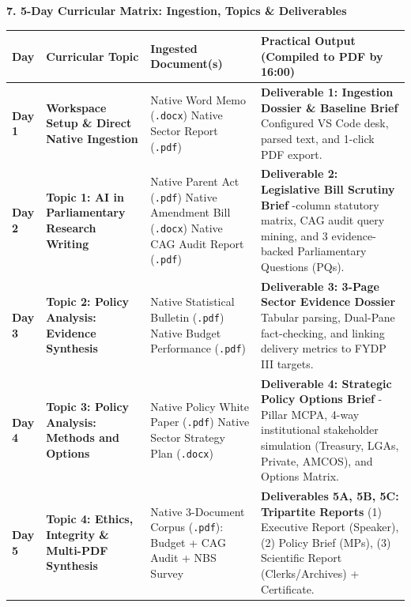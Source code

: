 \documentclass[10pt, a4paper]{article}
\begin{document}
\vspace{-0.15cm}
\noindent\textbf{\textcolor{tanzaniablue}{\large 7. 5-Day Curricular Matrix: Ingestion, Topics \& Deliverables}}
\vspace{0.1cm}
\begin{table}[htbp]
\centering
\footnotesize
\begin{tabular}{@{}>{\bfseries}p{1.1cm}p{3.5cm}p{4.8cm}p{6.8cm}@{}}
\toprule
Day & Curricular Topic & Ingested Document(s) & Practical Output (Compiled to PDF by 16:00) \\
\midrule
\textbf{Day 1} & \textbf{Workspace Setup \& Direct Native Ingestion} & Native Word Memo (\texttt{.docx}) \newline Native Sector Report (\texttt{.pdf}) & \textbf{Deliverable 1: Ingestion Dossier \& Baseline Brief} \newline Configured VS Code desk, parsed text, and 1-click PDF export. \\
\addlinespace[3pt]
\textbf{Day 2} & \textbf{Topic 1: AI in Parliamentary Research Writing} & Native Parent Act (\texttt{.pdf}) \newline Native Amendment Bill (\texttt{.docx}) \newline Native CAG Audit Report (\texttt{.pdf}) & \textbf{Deliverable 2: Legislative Bill Scrutiny Brief} \newline 4-column statutory matrix, CAG audit query mining, and 3 evidence-backed Parliamentary Questions (PQs). \\
\addlinespace[3pt]
\textbf{Day 3} & \textbf{Topic 2: Policy Analysis: Evidence Synthesis} & Native Statistical Bulletin (\texttt{.pdf}) \newline Native Budget Performance (\texttt{.pdf}) & \textbf{Deliverable 3: 3-Page Sector Evidence Dossier} \newline Tabular parsing, Dual-Pane fact-checking, and linking delivery metrics to FYDP III targets. \\
\addlinespace[3pt]
\textbf{Day 4} & \textbf{Topic 3: Policy Analysis: Methods and Options} & Native Policy White Paper (\texttt{.pdf}) \newline Native Sector Strategy Plan (\texttt{.docx}) & \textbf{Deliverable 4: Strategic Policy Options Brief} \newline 4-Pillar MCPA, 4-way institutional stakeholder simulation (Treasury, LGAs, Private, AMCOS), and Options Matrix. \\
\addlinespace[3pt]
\textbf{Day 5} & \textbf{Topic 4: Ethics, Integrity \& Multi-PDF Synthesis} & Native 3-Document Corpus (\texttt{.pdf}): \newline Budget + CAG Audit + NBS Survey & \textbf{Deliverables 5A, 5B, 5C: Tripartite Reports} \newline (1) Executive Report (Speaker), (2) Policy Brief (MPs), (3) Scientific Report (Clerks/Archives) + Certificate. \\
\bottomrule
\end{tabular}
\end{table}
\end{document}
